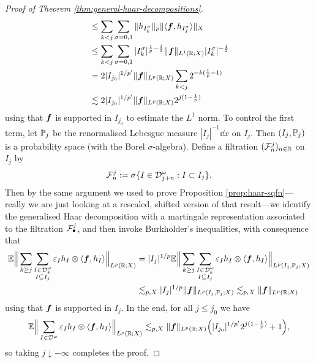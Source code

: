 \begin{proof}[Proof of Theorem \ref{thm:general-haar-decompositions}]
\begin{equation*}
\begin{aligned}
      &\leq \sum_{k < j} \sum_{\sigma = 0,1} \|h_{I^{\sigma}_{k}}\|_{p} \| \langle \mb{f}, h_{I^{\sigma}_{j}} \rangle \|_{X} \\
      &\leq  \sum_{k < j} \sum_{\sigma = 0,1} |I_{k}^\sigma|^{\frac{1}{p}-\frac{1}{2}} \|\mb{f}\|_{L^1(\R;X)} |I_{k}^{\sigma}|^{-\frac{1}{2}} \\
      &= 2|I_{j_{0}}|^{1/p'} \|\mb{f}\|_{L^p(\R;X)} \sum_{k < j} 2^{-k(\frac{1}{p} - 1)} \\
      &\lesssim 2 |I_{j_{0}}|^{1/p'} \|\mb{f}\|_{L^p(\R;X)} 2^{j(1 - \frac{1}{p})}
    \end{aligned}
  \end{equation*}
  using that $\mb{f}$ is supported in $I_{j_{0}}$ to estimate the $L^1$ norm.
  To control the first term, let $\P_{j}$ be the renormalised Lebesgue measure $|I_{j}|^{-1} \dd x$ on $I_{j}$.
  Then $(I_{j},\P_{j})$ is a probability space (with the Borel $\sigma$-algebra).
  Define a filtration $(\mc{F}_{n}^{j})_{n \in \N}$ on $I_{j}$ by
  \begin{equation*}
    \mc{F}_{n}^{j} := \sigma\{I \in \mc{D}^{\omega}_{j+n} : I \subset I_{j}\}.
  \end{equation*} 
  Then by the same argument we used to prove Proposition \ref{prop:haar-sqfn}---really we are just looking at a rescaled, shifted version of that result---we identify the generalised Haar decomposition with a martingale representation associated to the filtration $\mc{F}^{j}_{\bullet}$, and then invoke Burkholder's inequalities, with consequence that
  \begin{equation*}
    \begin{aligned}
      \E \Big\| \sum_{k \geq j} \sum_{\substack{I \in \mc{D}_{k}^{\omega} \\ I \subseteq I_{j}}} \varepsilon_{I} h_{I} \otimes \langle \mb{f}, h_{I} \rangle \Big\|_{L^p(\R;X)}
      &=  |I_{j}|^{1/p} \E \Big\| \sum_{k \geq j} \sum_{\substack{I \in \mc{D}_{k}^{\omega} \\ I \subseteq I_{j}}} \varepsilon_{I} h_{I} \otimes \langle \mb{f}, h_{I} \rangle \Big\|_{L^p(I_{j}, \P_{j};X)} \\
      &\lesssim_{p,X} |I_{j}|^{1/p} \|\mb{f}\|_{L^p(I_{j},\P_{j};X)} 
      \lesssim_{p,X} \|\mb{f}\|_{L^p(\R;X)}
    \end{aligned}
  \end{equation*}
  using that $\mb{f}$ is supported in $I_{j}$.
  In the end, for all $j \leq j_{0}$ we have
  \begin{equation*}
    \E \Big\| \sum_{I \in \mc{D}^{\omega}} \varepsilon_{I} h_{I} \otimes \langle \mb{f}, h_{I} \rangle \Big\|_{L^p(\R;X)}
    \lesssim_{p,X}  \|\mb{f}\|_{L^p(\R;X)} \Big(|I_{j_{0}}|^{1/p'}  2^{j(1 - \frac{1}{p})} + 1\Big),
  \end{equation*}
  so taking $j \downarrow -\infty$ completes the proof.
\end{proof}

